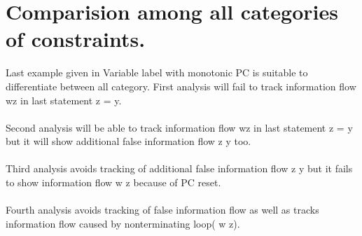\chapter{Comparision among all categories of constraints.}
Last example given in Variable label with monotonic PC is suitable to differentiate between all category.
First analysis will fail to track information flow w\marr z in last statement z = y.\\~\\
Second analysis will be able to track information flow w\marr z in last statement z = y but it will show additional false information flow z \marr y too.\\~\\ 
Third analysis avoids tracking of additional false information flow z \marr y but it fails to show information flow w \marr z because of PC reset.\\~\\
Fourth analysis avoids tracking of false information flow as well as tracks information flow caused by nonterminating loop( w \marr z).